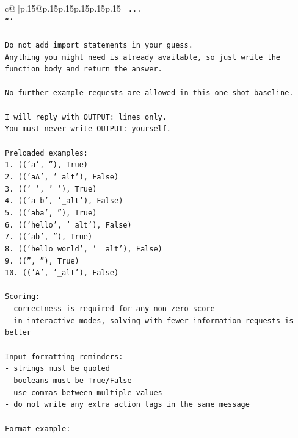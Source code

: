 \documentclass{article}
\begin{document}
{\begin{supertabular}{c@{$\;$}|p{.15\linewidth}@{}p{.15\linewidth}p{.15\linewidth}p{.15\linewidth}p{.15\linewidth}p{.15\linewidth}}
{{{\texttt{    ...} \\
\texttt{```} \\
\\ 
\texttt{Do not add import statements in your guess.} \\
\texttt{Anything you might need is already available, so just write the function body and return the answer.} \\
\\ 
\texttt{No further example requests are allowed in this one{-}shot baseline.} \\
\\ 
\texttt{I will reply with OUTPUT: lines only.} \\
\texttt{You must never write OUTPUT: yourself.} \\
\\ 
\texttt{Preloaded examples:} \\
\texttt{1. (('a', ''), True)} \\
\texttt{2. (('aA', '\_alt'), False)} \\
\texttt{3. (('   ', '   '), True)} \\
\texttt{4. (('a{-}b', '\_alt'), False)} \\
\texttt{5. (('aba', ''), True)} \\
\texttt{6. (('hello', '\_alt'), False)} \\
\texttt{7. (('ab', ''), True)} \\
\texttt{8. (('hello world', ' \_alt'), False)} \\
\texttt{9. (('', ''), True)} \\
\texttt{10. (('A', '\_alt'), False)} \\
\\ 
\texttt{Scoring:} \\
\texttt{{-} correctness is required for any non{-}zero score} \\
\texttt{{-} in interactive modes, solving with fewer information requests is better} \\
\\ 
\texttt{Input formatting reminders:} \\
\texttt{{-} strings must be quoted} \\
\texttt{{-} booleans must be True/False} \\
\texttt{{-} use commas between multiple values} \\
\texttt{{-} do not write any extra action tags in the same message} \\
\\ 
\texttt{Format example:} \\
}}}
\end{supertabular}}
\end{document}
